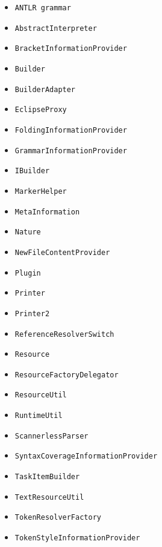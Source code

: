 \begin{itemize}
\item \texttt{ANTLR grammar}
\item \texttt{AbstractInterpreter}
\item \texttt{BracketInformationProvider}
\item \texttt{Builder}
\item \texttt{BuilderAdapter}
\item \texttt{EclipseProxy}
\item \texttt{FoldingInformationProvider}
\item \texttt{GrammarInformationProvider}
\item \texttt{IBuilder}
\item \texttt{MarkerHelper}
\item \texttt{MetaInformation}
\item \texttt{Nature}
\item \texttt{NewFileContentProvider}
\item \texttt{Plugin}
\item \texttt{Printer}
\item \texttt{Printer2}
\item \texttt{ReferenceResolverSwitch}
\item \texttt{Resource}
\item \texttt{ResourceFactoryDelegator}
\item \texttt{ResourceUtil}
\item \texttt{RuntimeUtil}
\item \texttt{ScannerlessParser}
\item \texttt{SyntaxCoverageInformationProvider}
\item \texttt{TaskItemBuilder}
\item \texttt{TextResourceUtil}
\item \texttt{TokenResolverFactory}
\item \texttt{TokenStyleInformationProvider}
\end{itemize}
